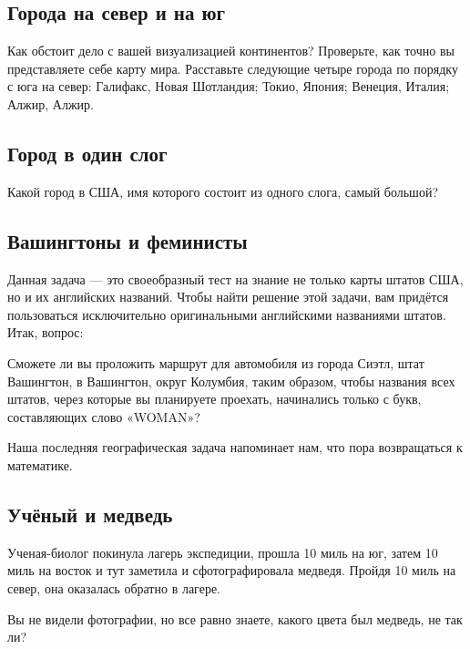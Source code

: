 \subsection*{Города на север и на юг}%


Как обстоит дело с вашей визуализацией континентов?
Проверьте, как точно вы представляете себе %
карту мира.
Расставьте следующие  четыре города по порядку с юга на север: 
Галифакс, Новая Шотландия; %
Токио, Япония; %
Венеция, Италия; %
Алжир, Алжир. %


\subsection*{Город в один слог}%


Какой город в США, имя которого состоит из одного слога,  самый большой?


\subsection*{Вашингтоны и феминисты}%


Данная задача --- это своеобразный тест на знание не только карты штатов США, но и их английских названий.  
Чтобы найти решение этой задачи, вам придётся пользоваться исключительно оригинальными английскими названиями штатов.  
Итак, вопрос:


Сможете ли вы проложить маршрут для автомобиля из города Сиэтл, штат Вашингтон, 
 в Вашингтон, округ Колумбия, таким образом, чтобы названия всех штатов, через которые вы планируете проехать, начинались только с букв, составляющих слово  «WOMAN»?


\medskip

Наша последняя географическая задача  напоминает нам, что пора возвращаться к математике.  %


\subsection*{Учёный и медведь}%


Ученая-биолог покинула лагерь экспедиции, прошла 10 миль на юг, затем 10 миль на восток и тут заметила и сфотографировала медведя.  Пройдя 10 миль на север, она оказалась обратно в лагере. 

\medskip

Вы не видели фотографии, но все равно знаете, какого цвета был медведь, не так ли?
